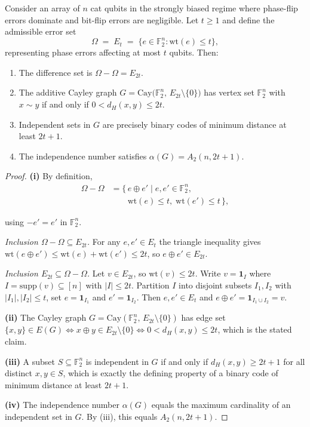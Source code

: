 \documentclass[10pt,a4paper]{amsart}
\begin{document}
\begin{lemma}
\label{lem:catq_cayley}
Consider an array of $n$ cat qubits in the strongly biased regime
where phase-flip errors dominate and bit-flip errors are negligible.
Let $t\ge 1$ and define the admissible error set
\[
   \Omega \;=\; E_t
     \;=\; \{e\in\mathbb{F}_2^n : \mathrm{wt}(e)\le t\},
\]
representing phase errors affecting at most $t$ qubits. Then:
\begin{enumerate}
\item[\textup{(i)}] The difference set is
  $\Omega-\Omega = E_{2t}$.
\item[\textup{(ii)}] The additive Cayley graph
  $G=\mathrm{Cay}\!\bigl(\mathbb{F}_2^n,\,E_{2t}\setminus\{0\}\bigr)$
  has vertex set $\mathbb{F}_2^n$ with $x\sim y$ if and only if
  $0<d_H(x,y)\le 2t$.
\item[\textup{(iii)}] Independent sets in $G$ are precisely binary
  codes of minimum distance at least $2t+1$.
\item[\textup{(iv)}] The independence number satisfies
  $\alpha(G) = A_2(n,2t+1)$.
\end{enumerate}
\end{lemma}

\begin{proof}
\textbf{(i)}
By definition,
\[
\begin{aligned}
\Omega-\Omega
   &= \{\,e\oplus e' \mid e,e'\in\mathbb{F}_2^n, \\
   &\qquad \mathrm{wt}(e)\le t,\;
            \mathrm{wt}(e')\le t \,\},
\end{aligned}
\]

using $-e'=e'$ in $\mathbb{F}_2^n$.

\emph{Inclusion $\Omega-\Omega\subseteq E_{2t}$.}
For any $e,e'\in E_t$ the triangle inequality gives
$\mathrm{wt}(e\oplus e') \le \mathrm{wt}(e)+\mathrm{wt}(e') \le 2t$,
so $e\oplus e'\in E_{2t}$.

\emph{Inclusion $E_{2t}\subseteq\Omega-\Omega$.}
Let $v\in E_{2t}$, so $\mathrm{wt}(v)\le 2t$. Write
$v=\mathbf{1}_I$ where $I=\mathrm{supp}(v)\subseteq[n]$ with
$|I|\le 2t$. Partition $I$ into disjoint subsets $I_1,I_2$ with
$|I_1|,|I_2|\le t$, set $e=\mathbf{1}_{I_1}$ and
$e'=\mathbf{1}_{I_2}$. Then $e,e'\in E_t$ and
$e\oplus e' = \mathbf{1}_{I_1\cup I_2} = v$.

\textbf{(ii)}
The Cayley graph $G=\mathrm{Cay}(\mathbb{F}_2^n,\,E_{2t}\setminus\{0\})$
has edge set
$\{x,y\}\in E(G)\Leftrightarrow x\oplus y\in E_{2t}\setminus\{0\}
\Leftrightarrow 0<d_H(x,y)\le 2t$,
which is the stated claim.

\textbf{(iii)}
A subset $S\subseteq\mathbb{F}_2^n$ is independent in $G$ if and
only if $d_H(x,y)\ge 2t+1$ for all distinct $x,y\in S$, which is
exactly the defining property of a binary code of minimum distance
at least $2t+1$.

\textbf{(iv)}
The independence number $\alpha(G)$ equals the maximum cardinality
of an independent set in $G$. By (iii), this equals $A_2(n,2t+1)$.
\end{proof}
\end{document}
